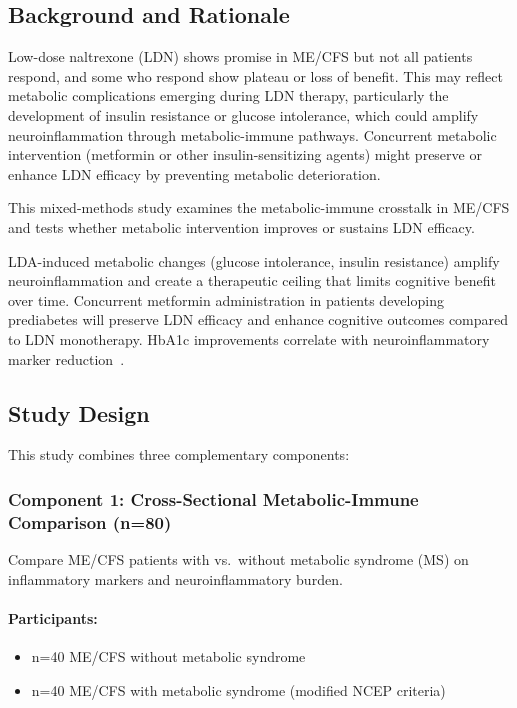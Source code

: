 \subsection{Background and Rationale}

Low-dose naltrexone (LDN) shows promise in ME/CFS but not all patients respond, and some who respond show plateau or loss of benefit. This may reflect metabolic complications emerging during LDN therapy, particularly the development of insulin resistance or glucose intolerance, which could amplify neuroinflammation through metabolic-immune pathways. Concurrent metabolic intervention (metformin or other insulin-sensitizing agents) might preserve or enhance LDN efficacy by preventing metabolic deterioration.

This mixed-methods study examines the metabolic-immune crosstalk in ME/CFS and tests whether metabolic intervention improves or sustains LDN efficacy.

\begin{hypothesis}
\label{hyp:metabolic-immune-ldn}
LDA-induced metabolic changes (glucose intolerance, insulin resistance) amplify neuroinflammation and create a therapeutic ceiling that limits cognitive benefit over time. Concurrent metformin administration in patients developing prediabetes will preserve LDN efficacy and enhance cognitive outcomes compared to LDN monotherapy. HbA1c improvements correlate with neuroinflammatory marker reduction~\cite{MCMC2024Neurometabolic}.
\end{hypothesis}

\subsection{Study Design}

This study combines three complementary components:

\subsubsection{Component 1: Cross-Sectional Metabolic-Immune Comparison (n=80)}

Compare ME/CFS patients with vs.\ without metabolic syndrome (MS) on inflammatory markers and neuroinflammatory burden.

\paragraph{Participants:}
\begin{itemize}
    \item n=40 ME/CFS without metabolic syndrome
    \item n=40 ME/CFS with metabolic syndrome (modified NCEP criteria)
\end{itemize}

